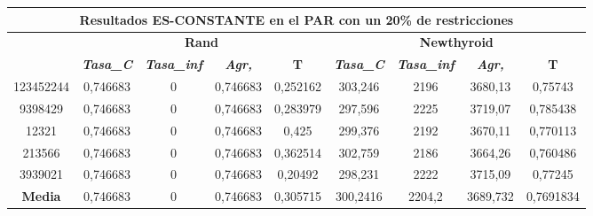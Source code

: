 \documentclass[12pt, spanish]{article}
\begin{document}
\begin{table}[H]
\begin{tabular}{|c|c|c|c|c|c|c|c|c|}
\hline
\multicolumn{9}{|c|}{\textbf{Resultados ES-CONSTANTE en el PAR con un 20\% de restricciones}}                                                                                                                     \\ \hline
\multirow{2}{*}{} & \multicolumn{4}{c|}{\textbf{Rand}}                                                            & \multicolumn{4}{c|}{\textbf{Newthyroid}}                                                      \\ \cline{2-9} 
                  & \textit{\textbf{Tasa\_C}} & \textit{\textbf{Tasa\_inf}} & \textit{\textbf{Agr,}} & \textbf{T} & \textit{\textbf{Tasa\_C}} & \textit{\textbf{Tasa\_inf}} & \textit{\textbf{Agr,}} & \textbf{T} \\ \hline
123452244         & 0,746683                  & 0                           & 0,746683               & 0,252162   & 303,246                   & 2196                        & 3680,13                & 0,75743    \\ \hline
9398429           & 0,746683                  & 0                           & 0,746683               & 0,283979   & 297,596                   & 2225                        & 3719,07                & 0,785438   \\ \hline
12321             & 0,746683                  & 0                           & 0,746683               & 0,425      & 299,376                   & 2192                        & 3670,11                & 0,770113   \\ \hline
213566            & 0,746683                  & 0                           & 0,746683               & 0,362514   & 302,759                   & 2186                        & 3664,26                & 0,760486   \\ \hline
3939021           & 0,746683                  & 0                           & 0,746683               & 0,20492    & 298,231                   & 2222                        & 3715,09                & 0,77245    \\ \hline
\textbf{Media}    & 0,746683                  & 0                           & 0,746683               & 0,305715   & 300,2416                  & 2204,2                      & 3689,732               & 0,7691834  \\ \hline
\end{tabular}
\end{table}
\end{document}
